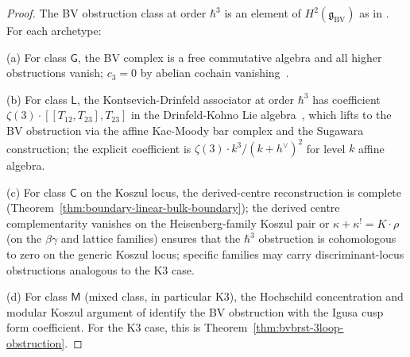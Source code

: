 \begin{proof}
The BV obstruction class at order $\hbar^3$ is an element of
$H^2(\mathfrak{g}_{\mathrm{BV}})$ as in
\cite[Ch.~5, Vol.~2]{CostelloGwilliam2021}. For each archetype:

(a) For class $\mathsf{G}$, the BV complex is a free commutative
algebra and all higher obstructions vanish; $c_3 = 0$ by abelian
cochain vanishing~\cite[Prop.~4.3]{costello-renormalization}.

(b) For class $\mathsf{L}$, the Kontsevich-Drinfeld associator at
order $\hbar^3$ has coefficient $\zeta(3)\cdot[[T_{12}, T_{23}],
T_{23}]$ in the Drinfeld-Kohno Lie algebra~\cite[\S 4]{Drinfeld1991},
which lifts to the BV obstruction via the affine Kac-Moody bar
complex and the Sugawara construction; the explicit coefficient is
$\zeta(3)\cdot k^3/(k+h^\vee)^2$ for level $k$ affine algebra.

(c) For class $\mathsf{C}$ on the Koszul locus, the derived-centre
reconstruction is complete (Theorem~\ref{thm:boundary-linear-bulk-boundary});
the derived centre complementarity
vanishes on the Heisenberg-family Koszul pair
or $\kappa + \kappa^! = K\cdot\rho$ (on the $\beta\gamma$ and lattice
families) ensures that the $\hbar^3$ obstruction is cohomologous to
zero on the generic Koszul locus; specific families may carry
discriminant-locus obstructions analogous to the K3 case.

(d) For class $\mathsf{M}$ (mixed class, in particular K3), the
Hochschild concentration and modular Koszul argument of
\cite[Ch.~\ref{V3-ch:k3-chiral-bialgebra-platonic}]{Lorgat3}
identify the BV obstruction with the Igusa cusp form
coefficient. For the K3 case, this is
Theorem~\ref{thm:bvbrst-3loop-obstruction}.
\end{proof}

